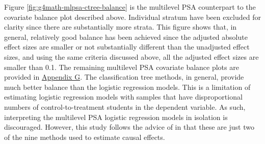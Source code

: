 \documentclass[letterpaper,12p,twoside]{article} %
\begin{document}
Figure \ref{fig:g4math-mlpsa-ctree-balance} is the multilevel PSA counterpart to the covariate balance plot described above. Individual stratum have been excluded for clarity since there are substantially more strata. This figure shows that, in general, relatively good balance has been achieved since the adjusted absolute effect sizes are smaller or not substantially different than the unadjusted effect sizes, and using the same criteria discussed above, all the adjusted effect sizes are smaller than 0.1. The remaining multilevel PSA covariate balance plots are provided in \hyperref[appendixG]{Appendix G}. The classification tree methods, in general, provide much better balance than the logistic regression models. This is a limitation of estimating logistic regression models with samples that have disproportional numbers of control-to-treatment students in the dependent variable. As such, interpreting the multilevel PSA logistic regression models in isolation is discouraged. However, this study follows the advice of  in that these are just two of the nine methods used to estimate causal effects.
\end{document}
